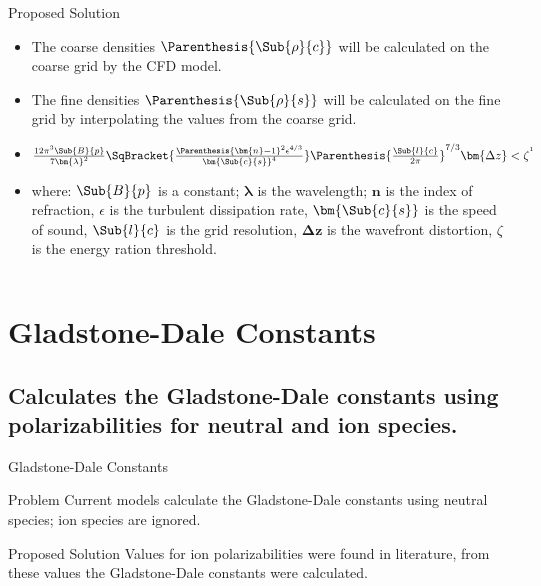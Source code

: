     \begin{frame}{Proposed Solution}
        \begin{itemize}
            \item The coarse densities $\Parenthesis{\Sub{\rho}{c}}$ will be calculated on the coarse grid by the CFD model.
            \item The fine densities $\Parenthesis{\Sub{\rho}{s}}$ will be calculated on the fine grid by interpolating the values from the coarse grid.
            \item $ \frac{12\pi^3\Sub{B}{p}}{7\bm{\lambda}^2}\SqBracket{\frac{ \Parenthesis{\bm{n}-1}^2 \epsilon^{4/3}}{\bm{\Sub{c}{s}} ^4} } \Parenthesis{\frac{\Sub{l}{c}}{2\pi }}^{7/3} \bm{\Delta z} < \zeta^{\text{\footnotemark}}$
            \item where: $\Sub{B}{p}$ is a constant; $\bm{\lambda}$ is the wavelength; $\bm{n}$ is the index of refraction, $\epsilon$ is the turbulent dissipation rate, $\bm{\Sub{c}{s}}$ is the speed of sound, $\Sub{l}{c}$ is the grid resolution, $\bm{\Delta z}$ is the wavefront distortion, $\zeta$ is the energy ration threshold.   
        \end{itemize}
    \end{frame}

    \begin{frame}{$ $ }
        \Huge {}
    \end{frame}
    \section{Gladstone-Dale Constants}
    \subsection{Calculates the Gladstone-Dale constants using polarizabilities for neutral and ion species.\\}
    \begin{frame}{Gladstone-Dale Constants}
        \begin{block}{Problem}
            Current models calculate the Gladstone-Dale constants using neutral species; ion species are ignored.
        \end{block}
        \begin{exampleblock}{Proposed Solution}
            Values for ion polarizabilities were found in literature, from these values the Gladstone-Dale constants were calculated. 
        \end{exampleblock}
    \end{frame}


